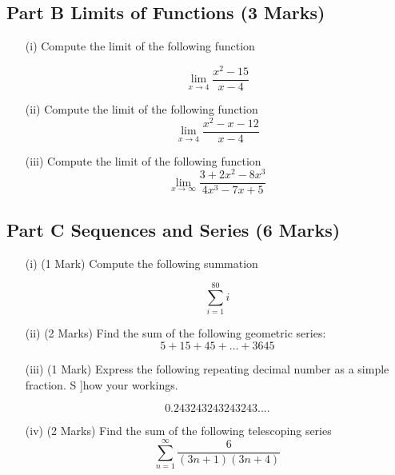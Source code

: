 \documentclass[11pt]{article} %
\begin{document}
\newpage
\subsection*{Part B Limits of Functions (3 Marks)}

\begin{enumerate}
	\item[(i)]  Compute the limit of the following function
	
	\[\lim_{x \to 4 } \frac{x^2-15}{x-4}\]
	\vspace{1.5cm}
	\item[(ii)]  Compute the limit of the following function
	\vspace{1.5cm}
	\[\lim_{x \to 4 } \frac{x^2-x-12}{x-4}\]
	\vspace{1.5cm}
	\item[(iii)]  Compute the limit of the following function
	\[ \lim_{x \to \infty } \frac{3 + 2x^2 - 8x^3 }{4x^3 - 7x + 5} \]	
	
\end{enumerate}
\newpage

\newpage
\subsection*{Part C Sequences and Series (6 Marks)}

\begin{enumerate}
	\item[(i)](1 Mark)  Compute the following summation
	
	\[ \sum_{i=1}^{80} i \]

	\vspace{5.5cm}
	\item[(ii)] (2 Marks) Find the sum of the following geometric series: 
		\[5 + 15 + 45 +  \ldots + 3645\]
		\newpage

	
	\item[(iii)] (1 Mark) Express the following repeating decimal number as a simple fraction. S
	]how your workings.
	
	\[0.243243243243243....\]
	\vspace{5.5cm}
	\item[(iv)] (2 Marks) Find the sum of the following telescoping series
		\[  \sum^{\infty}_{n=1}   \frac{6}{(3n+1)(3n+4)}  \]
		
\end{enumerate}
\end{document}
